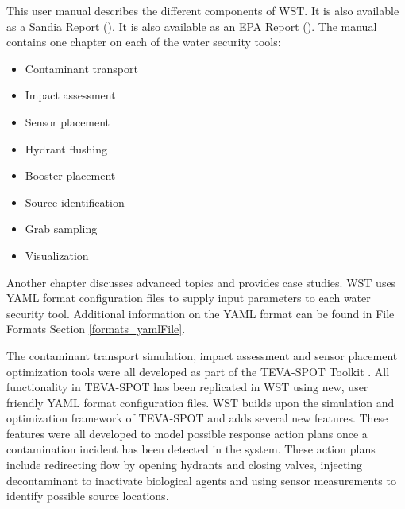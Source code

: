 This user manual describes the different components of WST. 
\ifEPAReport
It is also available as a Sandia Report (\citet{WSTSandreport}).
\else
It is also available as an EPA Report (\citet{WSTEPAreport}).
\fi
The manual contains one chapter on each of the water security tools:
\begin{itemize}
\item Contaminant transport
\item Impact assessment
\item Sensor placement
\item Hydrant flushing 
\item Booster placement
\item Source identification
\item Grab sampling
\item Visualization
\end{itemize}
Another chapter discusses advanced topics and provides case studies. 
WST uses YAML format configuration files to supply input parameters to each water security tool.  
Additional information on the YAML format can be found in File Formats Section \ref{formats_yamlFile}.

The contaminant transport simulation, impact assessment and sensor placement optimization tools were all 
developed as part of the TEVA-SPOT Toolkit \citep{TEVASPOTusermanual}. All functionality in TEVA-SPOT has been replicated 
in WST using new, user friendly YAML format configuration files. WST builds upon the simulation and optimization 
framework of TEVA-SPOT and adds several new features. These features were all 
developed to model possible response action plans once a contamination incident has been detected in the system. 
These action plans include redirecting flow by opening hydrants and closing valves, injecting decontaminant 
to inactivate biological agents and using sensor measurements to identify possible source locations.

